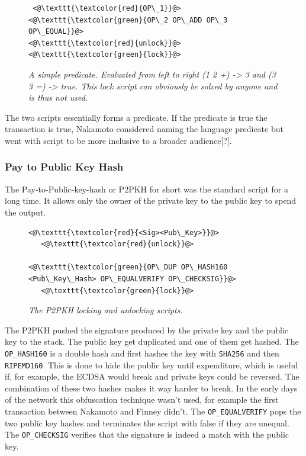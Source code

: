 \begin{figure}[!hbt]
	
	\begin{lstlisting}
 <@\texttt{\textcolor{red}{OP\_1}}@>   <@\texttt{\textcolor{green}{OP\_2 OP\_ADD OP\_3 OP\_EQUAL}}@>
<@\texttt{\textcolor{red}{unlock}}@>           <@\texttt{\textcolor{green}{lock}}@>
	\end{lstlisting}
	
	\caption{\textit{ A simple predicate. Evaluated from left to right (1 2 +) -> 3 and
			(3 3 =) -> true. This lock script can obviously be solved by anyone and is thus not used.
	}}
	\label{fig:simple:script}
\end{figure}

The two scripts essentially forms a predicate. If the predicate is true the transaction is true, Nakamoto considered naming the language predicate but went with script to be more inclusive to a broader audience[?].

\subsubsection{Pay to Public Key Hash}

The Pay-to-Public-key-hash or P2PKH for short was the standard script for a long time. It allows only the owner of 
the private key to the public key to spend the output.


\begin{figure}[!hbt]
	
	\begin{lstlisting}
<@\texttt{\textcolor{red}{<Sig><Pub\_Key>}}@>   
   <@\texttt{\textcolor{red}{unlock}}@>
   
<@\texttt{\textcolor{green}{OP\_DUP OP\_HASH160 <Pub\_Key\_Hash> OP\_EQUALVERIFY OP\_CHECKSIG}}@>
   <@\texttt{\textcolor{green}{lock}}@>
	\end{lstlisting}
	
	\caption{\textit{ The P2PKH locking and unlocking scripts.
	}}
	\label{fig:P2PKH}
\end{figure}

The P2PKH pushed the signature produced by the private key and the public key to the stack. The public key get duplicated and one of them get hashed. The \texttt{OP\_HASH160} is a double hash and first hashes the key with \texttt{SHA256} and then \texttt{RIPEMD160}. This is done to hide the public key until expenditure, which is useful if, for example, the ECDSA would break and private keys could be reversed. The combination of these two hashes makes it way harder to break. In the early days of the network this obfuscation technique wasn't used, for example the first transaction between Nakamoto and Finney didn't\cite{nakamoto:finney:tx}.
The \texttt{OP\_EQUALVERIFY} pops the two public key hashes and terminates the script with false if they are unequal.
The \texttt{OP\_CHECKSIG} verifies that the signature is indeed a match with the public key. 

